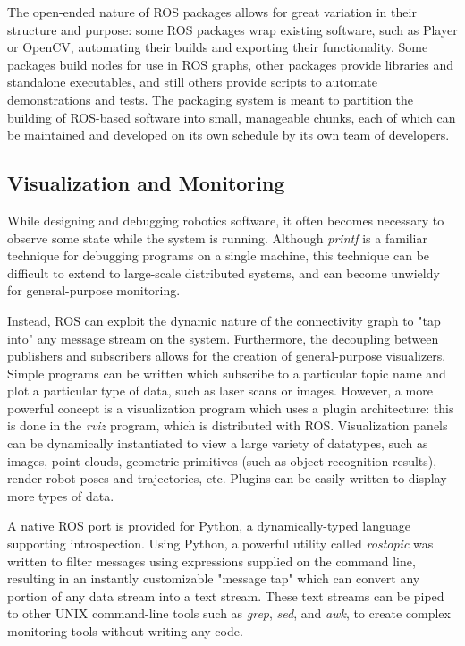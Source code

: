 The open-ended nature of ROS packages allows for great variation in their structure and purpose: some ROS packages wrap existing software, such as Player or OpenCV, automating their builds and exporting their functionality. Some packages build nodes for use in ROS graphs, other packages provide libraries and standalone executables, and still others provide scripts to automate demonstrations and tests. The packaging system is meant to partition the building of ROS-based software into small, manageable chunks, each of which can be maintained and developed on its own schedule by its own team of developers.

\subsection{Visualization and Monitoring}

While designing and debugging robotics software, it often becomes necessary to observe some state while the system is running. Although \textit{printf} is a familiar technique for debugging programs on a single machine, this technique can be difficult to extend to large-scale distributed systems, and can become unwieldy for general-purpose monitoring.

Instead, ROS can exploit the dynamic nature of the connectivity graph to "tap into" any message stream on the system. Furthermore, the decoupling between publishers and subscribers allows for the creation of general-purpose visualizers. Simple programs can be written which subscribe to a particular topic name and plot a particular type of data, such as laser scans or images. However, a more powerful concept is a visualization program which uses a plugin architecture: this is done in the \textit{rviz} program, which is distributed with ROS. Visualization panels can be dynamically instantiated to view a large variety of datatypes, such as images, point clouds, geometric primitives (such as object recognition results), render robot poses and trajectories, etc. Plugins can be easily written to display more types of data.

A native ROS port is provided for Python, a dynamically-typed language supporting introspection. Using Python, a powerful utility called \textit{rostopic} was written to filter messages using expressions supplied on the command line, resulting in an instantly customizable "message tap" which can convert any portion of any data stream into a text stream. These text streams can be piped to other UNIX command-line tools such as \textit{grep}, \textit{sed}, and \textit{awk}, to create complex monitoring tools without writing any code.

